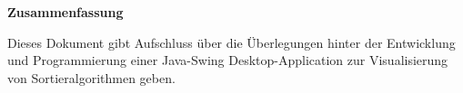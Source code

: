 \begin{center}
\textbf{\large Zusammenfassung}
\end{center}

Dieses Dokument gibt Aufschluss über die Überlegungen hinter
der Entwicklung und Programmierung einer Java-Swing Desktop-Application 
zur Visualisierung von Sortieralgorithmen geben.

\vspace{1cm}
